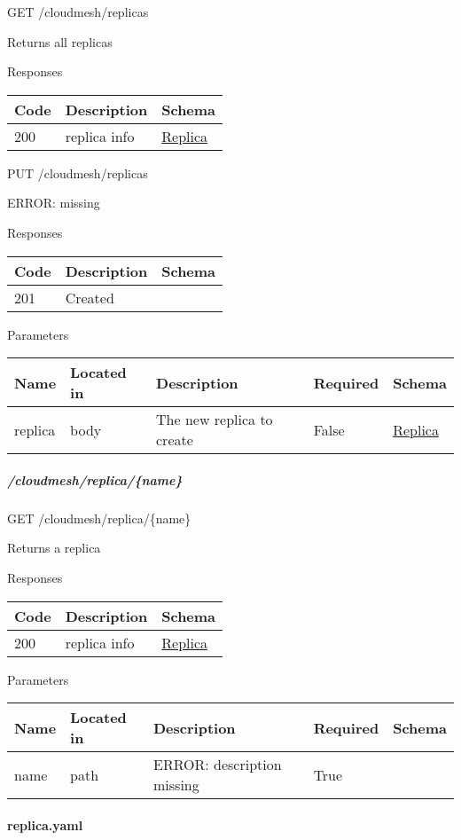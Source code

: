 \documentclass[9pt,]{article}
\let\oldparagraph\paragraph
\renewcommand{\paragraph}[1]{\oldparagraph{#1}\mbox{}}
\let\oldsubparagraph\subparagraph
\renewcommand{\subparagraph}[1]{\oldsubparagraph{#1}\mbox{}}
\begin{document}
GET /cloudmesh/replicas

Returns all replicas

Responses

\begin{longtable}[]{@{}lll@{}}
\toprule
Code & Description & Schema\tabularnewline
\midrule
\endhead
200 & replica info & \protect\hyperlink{replica}{Replica}\tabularnewline
\bottomrule
\end{longtable}

PUT /cloudmesh/replicas

ERROR: missing

Responses

\begin{longtable}[]{@{}lll@{}}
\toprule
Code & Description & Schema\tabularnewline
\midrule
\endhead
201 & Created &\tabularnewline
\bottomrule
\end{longtable}

Parameters

\begin{longtable}[]{@{}lllll@{}}
\toprule
Name & Located in & Description & Required & Schema\tabularnewline
\midrule
\endhead
replica & body & The new replica to create & False &
\protect\hyperlink{replica}{Replica}\tabularnewline
\bottomrule
\end{longtable}

\hypertarget{cloudmeshreplicaname}{%
\subparagraph{/cloudmesh/replica/\{name\}}\label{cloudmeshreplicaname}}

GET /cloudmesh/replica/\{name\}

Returns a replica

Responses

\begin{longtable}[]{@{}lll@{}}
\toprule
Code & Description & Schema\tabularnewline
\midrule
\endhead
200 & replica info & \protect\hyperlink{replica}{Replica}\tabularnewline
\bottomrule
\end{longtable}

Parameters

\begin{longtable}[]{@{}lllll@{}}
\toprule
Name & Located in & Description & Required & Schema\tabularnewline
\midrule
\endhead
name & path & ERROR: description missing & True &\tabularnewline
\bottomrule
\end{longtable}

\hypertarget{replica.yaml}{%
\paragraph{replica.yaml}\label{replica.yaml}}
\end{document}
